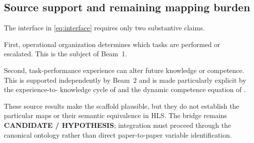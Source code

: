 \subsection{Source support and remaining mapping burden}

The interface in \eqref{eq:interface} requires only two substantive claims.

First, operational organization determines which tasks are performed or escalated. This is
the subject of Beam~1.

Second, task-performance experience can alter future knowledge or competence. This is
supported independently by Beam~2 and is made particularly explicit by the experience-to-
knowledge cycle of \citet{argotemiron2011} and the dynamic competence equation of
\citet{gutjahr2011}.

These source results make the scaffold plausible, but they do not establish the particular
maps or their semantic equivalence in HLS. The bridge remains \textbf{CANDIDATE /
HYPOTHESIS}; integration must proceed through the canonical ontology rather than direct
paper-to-paper variable identification.
